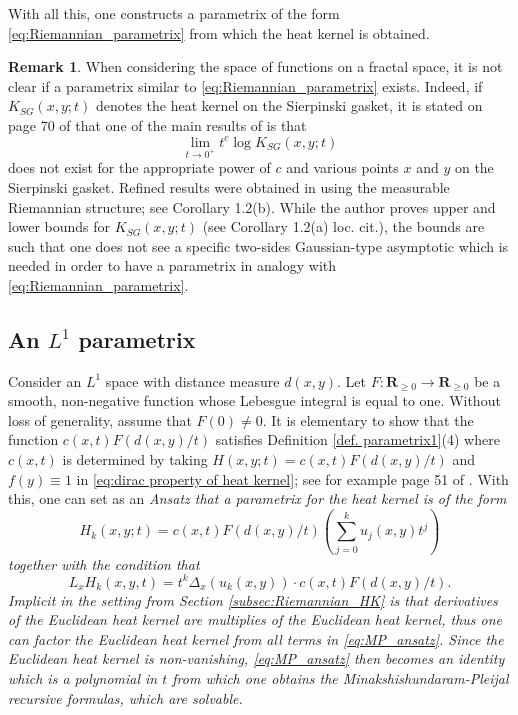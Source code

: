 \documentclass[11pt,reqno]{amsart}
\theoremstyle{remark}
\theoremstyle{definition}
\newtheorem{remark}{Remark}
\numberwithin{theorem}{section} \numberwithin{equation}{section}
\begin{document}
With all this, one constructs a parametrix of the form \eqref{eq:Riemannian_parametrix} from which the heat kernel is
obtained.


\begin{remark}\label{rem:non_gauss_asymptotics}
When considering the space of functions on a fractal space, it is not clear if a parametrix
similar to \eqref{eq:Riemannian_parametrix} exists. Indeed, if $K_{SG}(x,y;t)$ denotes the heat kernel on the Sierpinski gasket,
it is stated on page 70 of \cite{Ka12} that one of the main results of \cite{Ku97} is that
$$
\lim\limits_{t \rightarrow 0^{+}} t^{c}\log K_{SG}(x,y;t)
$$
does not exist for the appropriate power of $c$ and various points $x$ and $y$ on the Sierpinski gasket.  Refined results
were obtained in \cite{Ka12} using the measurable Riemannian structure; see Corollary 1.2(b).  While the author proves upper
and lower bounds for $K_{SG}(x,y;t)$ (see Corollary 1.2(a) loc. cit.), the bounds are such that one does not see a specific two-sides
Gaussian-type asymptotic which is needed in order to have a parametrix in analogy with \eqref{eq:Riemannian_parametrix}.
\end{remark}

\subsection{An $L^1$ parametrix}
Consider an $L^{1}$ space with distance measure $d(x,y)$.  Let $F : \mathbf{R}_{\geq 0} \rightarrow \mathbf{R}_{\geq 0}$ be
a smooth, non-negative  function whose Lebesgue integral is equal to one.  Without loss of generality, assume that
$F(0) \neq 0$.  It is elementary to show that the function $c(x,t)F(d(x,y)/t)$ satisfies Definition \ref{def. parametrix1}(4)
where $c(x,t)$ is determined by taking $H(x,y;t)=c(x,t)F(d(x,y)/t)$ and $f(y) \equiv 1$ in \eqref{eq:dirac property of heat kernel}; see for example page 51 of \cite{La99}.  With this, one can
set as an \it Ansatz \rm that a parametrix for the heat kernel is of the form
\begin{equation}\label{eq:L1_parametrix}
H_{k}(x,y;t) = c(x,t)F(d(x,y)/t)\left(\sum\limits_{j=0}^{k}u_{j}(x,y)t^{j}\right)
\end{equation}
together with the condition that
\begin{equation}\label{eq:MP_L1_ansatz}
L_{x} H_{k}(x,y,t) = t^{k}\Delta_{x}(u_{k}(x,y))\cdot c(x,t)F(d(x,y)/t).
\end{equation}
Implicit in the setting from Section \ref{subsec:Riemannian_HK} is that derivatives of the Euclidean heat kernel are
multiplies of the Euclidean heat kernel, thus one can factor the Euclidean heat kernel from all terms in \eqref{eq:MP_ansatz}.
Since the Euclidean heat kernel is non-vanishing,
\eqref{eq:MP_ansatz} then becomes an identity which is a polynomial in $t$ from which one obtains the Minakshishundaram-Pleijal
recursive formulas, which are solvable.
\end{document}
